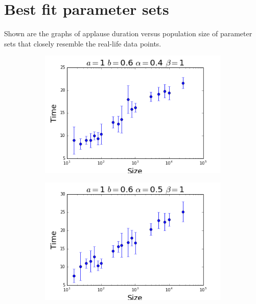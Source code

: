 \newpage
\section{Best fit parameter sets}
\label{apndx:bestfit}
Shown are the graphs of applause duration versus population size of parameter sets that closely resemble the real-life data points.

\begin{figure}[h]
  \centering
  \begin{subfigure}[b]{0.4\linewidth}
    \includegraphics[width=\linewidth]{images/appendix/bestfit/confirm1.png}
  \end{subfigure}
  \begin{subfigure}[b]{0.4\linewidth}
    \includegraphics[width=\linewidth]{images/appendix/bestfit/confirm2.png}
  \end{subfigure}
\end{figure}

